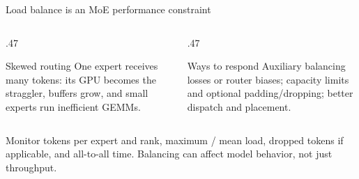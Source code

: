 \documentclass[handout]{beamer}
\begin{document}
\begin{frame}{Load balance is an MoE performance constraint}
  \begin{columns}[t]
    \begin{column}{.47\linewidth}
      \begin{alertblock}{Skewed routing}
        One expert receives many tokens: its GPU becomes the straggler, buffers grow, and small experts run inefficient GEMMs.
      \end{alertblock}
    \end{column}
    \begin{column}{.47\linewidth}
      \begin{block}{Ways to respond}
        Auxiliary balancing losses or router biases; capacity limits and optional padding/dropping; better dispatch and placement.
      \end{block}
    \end{column}
  \end{columns}
  \vfill
  \small Monitor tokens per expert and rank, maximum / mean load, dropped tokens if applicable, and all-to-all time. Balancing can affect model behavior, not just throughput.
\end{frame}
\end{document}
